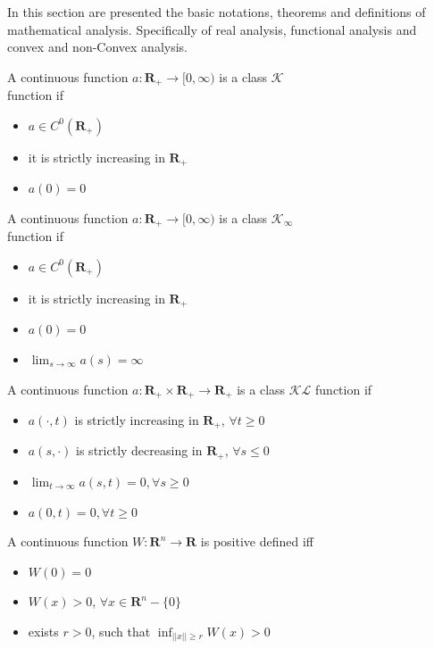     In this section are presented the basic notations, theorems and definitions of mathematical analysis. Specifically of real analysis, functional analysis and convex and non-Convex analysis.
    \begin{definition}\label{def:2.17}
        \cite{folland2013real} A continuous function $a:\mathbf{R}_+ \to [0,\infty)$ is a class $\mathcal{K}$ \\function if
        \begin{itemize}
            \item $a \in C^0(\mathbf{R}_+)$
            \item it is strictly increasing in $\mathbf{R}_+$
            \item $a(0) = 0$
        \end{itemize}
    \end{definition}
    \begin{definition}\label{def:2.18}
        \cite{folland2013real} A continuous function $a:\mathbf{R}_+ \to [0,\infty)$ is a class $\mathcal{K}_{\infty}$ \\function if
        \begin{itemize}
            \item $a \in C^0(\mathbf{R}_+)$
            \item it is strictly increasing in $\mathbf{R}_+$
            \item $a(0) = 0$
            \item $\lim_{s \to \infty} a(s) = \infty$
        \end{itemize}
    \end{definition}
    \begin{definition}\label{def:2.19}
        \cite{folland2013real} A continuous function $a: \mathbf{R_+} \times \mathbf{R_+} \to \mathbf{R_+}$ is a class $\mathcal{KL}$ function if
        \begin{itemize}
            \item $a(\cdot, t)$ is strictly increasing in $\mathbf{R_+}$, $\forall t \geq 0$
            \item $a(s,\cdot)$ is strictly decreasing in $\mathbf{R_+}$, $\forall s \leq 0$
            \item $\lim_{t \to \infty} a(s,t) = 0, \forall s \geq 0$
            \item $a(0,t) = 0, \forall t \geq 0$
        \end{itemize}
    \end{definition}
    
    \begin{definition}\label{def:2.20}
        \cite{HK2001} A continuous function $W: \mathbf{R}^n \to \mathbf{R}$ is positive defined iff
        \begin{itemize}
            \item $W(0) = 0$
            \item $W(x) > 0$, \hspace{2.0mm} $\forall x \in \mathbf{R}^n - \{0\}$
            \item exists $r > 0$, such that $\inf_{||x|| \geq r} W(x) > 0$
        \end{itemize}
    \end{definition}
    
